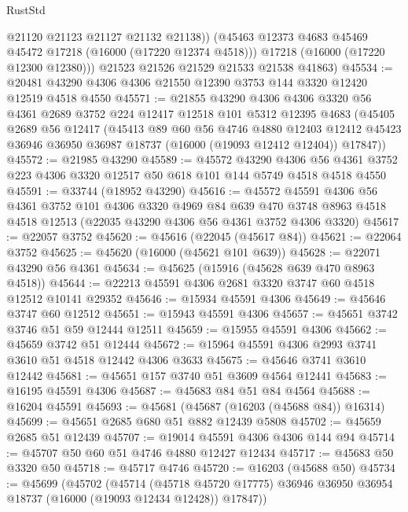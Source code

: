 \begin{lexlean}{RustStd}
\begin{coremodule}
            @21120
            @21123
            @21127
            @21132
            @21138))
        (@45463 @12373 @4683 @45469 @45472 @17218 (@16000 (@17220 @12374 @4518)))
        @17218
        (@16000 (@17220 @12300 @12380)))
      @21523
      @21526
      @21529
      @21533
      @21538
      @41863)
@45534 := @20481 @43290 @4306 @4306 @21550 @12390 @3753 @144 @3320 @12420 @12519 @4518 @4550
@45571 := @21855
    @43290
    @4306
    @4306
    @3320
    @56
    @4361
    @2689
    @3752
    @224
    @12417
    @12518
    @101
    @5312
    @12395
    @4683
    (@45405
      @2689
      @56
      @12417
      (@45413
        @89
        @60
        @56
        @4746
        @4880
        @12403
        @12412
        @45423
        @36946
        @36950
        @36987
        @18737
        (@16000 (@19093 @12412 @12404))
        @17847))
@45572 := @21985 @43290
@45589 := @45572
    @43290
    @4306
    @56
    @4361
    @3752
    @223
    @4306
    @3320
    @12517
    @50
    @618
    @101
    @144
    @5749
    @4518
    @4518
    @4550
@45591 := @33744 (@18952 @43290)
@45616 := @45572
    @45591
    @4306
    @56
    @4361
    @3752
    @101
    @4306
    @3320
    @4969
    @84
    @639
    @470
    @3748
    @8963
    @4518
    @4518
    @12513
    (@22035 @43290 @4306 @56 @4361 @3752 @4306 @3320)
@45617 := @22057 @3752
@45620 := @45616 (@22045 (@45617 @84))
@45621 := @22064 @3752
@45625 := @45620 (@16000 (@45621 @101 @639))
@45628 := @22071 @43290 @56 @4361
@45634 := @45625 (@15916 (@45628 @639 @470 @8963 @4518))
@45644 := @22213 @45591 @4306 @2681 @3320 @3747 @60 @4518 @12512 @10141 @29352
@45646 := @15934 @45591 @4306
@45649 := @45646 @3747 @60 @12512
@45651 := @15943 @45591 @4306
@45657 := @45651 @3742 @3746 @51 @59 @12444 @12511
@45659 := @15955 @45591 @4306
@45662 := @45659 @3742 @51 @12444
@45672 := @15964 @45591 @4306 @2993 @3741 @3610 @51 @4518 @12442 @4306 @3633
@45675 := @45646 @3741 @3610 @12442
@45681 := @45651 @157 @3740 @51 @3609 @4564 @12441
@45683 := @16195 @45591 @4306
@45687 := @45683 @84 @51 @84 @4564
@45688 := @16204 @45591
@45693 := @45681 (@45687 (@16203 (@45688 @84)) @16314)
@45699 := @45651 @2685 @680 @51 @882 @12439 @5808
@45702 := @45659 @2685 @51 @12439
@45707 := @19014 @45591 @4306 @4306 @144 @94
@45714 := @45707 @50 @60 @51 @4746 @4880 @12427 @12434
@45717 := @45683 @50 @3320 @50
@45718 := @45717 @4746
@45720 := @16203 (@45688 @50)
@45734 := @45699
    (@45702
      (@45714
        (@45718 @45720 @17775)
        @36946
        @36950
        @36954
        @18737
        (@16000 (@19093 @12434 @12428))
        @17847))

\end{coremodule}
\end{lexlean}
